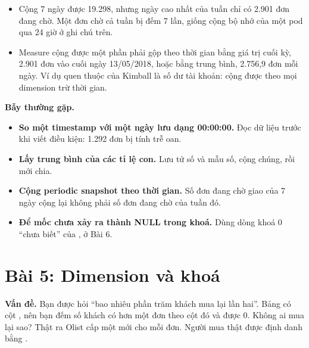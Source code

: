 \begin{itemize}
  \item Cộng 7 ngày được 19.298, nhưng ngày cao nhất của tuần chỉ có 2.901 đơn đang chờ. Một đơn chờ cả tuần bị đếm 7 lần, giống cộng bộ nhớ của một pod qua 24 giờ ở ghi chú trên.
  \item Measure cộng được một phần phải gộp theo thời gian bằng giá trị cuối kỳ, 2.901 đơn vào cuối ngày 13/05/2018, hoặc bằng trung bình, 2.756,9 đơn mỗi ngày. Ví dụ quen thuộc của Kimball là số dư tài khoản: cộng được theo mọi dimension trừ thời gian.
\end{itemize}

\begin{luuy}
\textbf{Bẫy thường gặp.}
\begin{itemize}
  \item \textbf{So một timestamp với một ngày lưu dạng 00:00:00.} Đọc dữ liệu trước khi viết điều kiện: 1.292 đơn bị tính trễ oan.
  \item \textbf{Lấy trung bình của các tỉ lệ con.} Lưu tử số và mẫu số, cộng chúng, rồi mới chia.
  \item \textbf{Cộng periodic snapshot theo thời gian.} Số đơn đang chờ giao của 7 ngày cộng lại không phải số đơn đang chờ của tuần đó.
  \item \textbf{Để mốc chưa xảy ra thành NULL trong khoá.} Dùng dòng khoá 0 ``chưa biết'' của , ở Bài 6.
\end{itemize}
\end{luuy}

\section{Bài 5: Dimension và khoá}

\textbf{Vấn đề.} Bạn được hỏi ``bao nhiêu phần trăm khách mua lại lần hai''. Bảng  có cột , nên bạn đếm số khách có hơn một đơn theo cột đó và được 0. Không ai mua lại sao? Thật ra Olist cấp một  mới cho mỗi đơn. Người mua thật được định danh bằng .

